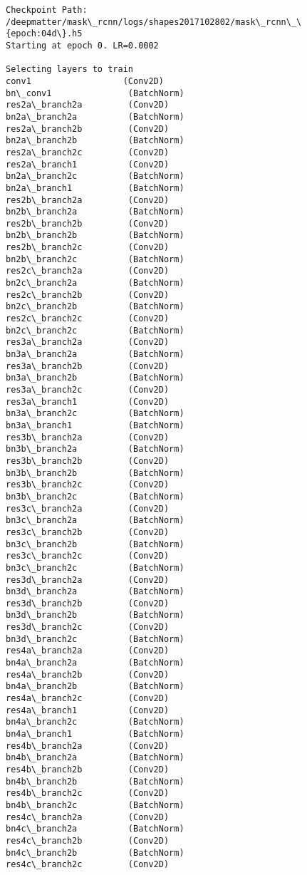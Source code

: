 \documentclass[11pt]{article}
\begin{document}
    \begin{Verbatim}[commandchars=\\\{\}]
Checkpoint Path:  /deepmatter/mask\_rcnn/logs/shapes2017102802/mask\_rcnn\_\{epoch:04d\}.h5
Starting at epoch 0. LR=0.0002

Selecting layers to train
conv1                  (Conv2D)
bn\_conv1               (BatchNorm)
res2a\_branch2a         (Conv2D)
bn2a\_branch2a          (BatchNorm)
res2a\_branch2b         (Conv2D)
bn2a\_branch2b          (BatchNorm)
res2a\_branch2c         (Conv2D)
res2a\_branch1          (Conv2D)
bn2a\_branch2c          (BatchNorm)
bn2a\_branch1           (BatchNorm)
res2b\_branch2a         (Conv2D)
bn2b\_branch2a          (BatchNorm)
res2b\_branch2b         (Conv2D)
bn2b\_branch2b          (BatchNorm)
res2b\_branch2c         (Conv2D)
bn2b\_branch2c          (BatchNorm)
res2c\_branch2a         (Conv2D)
bn2c\_branch2a          (BatchNorm)
res2c\_branch2b         (Conv2D)
bn2c\_branch2b          (BatchNorm)
res2c\_branch2c         (Conv2D)
bn2c\_branch2c          (BatchNorm)
res3a\_branch2a         (Conv2D)
bn3a\_branch2a          (BatchNorm)
res3a\_branch2b         (Conv2D)
bn3a\_branch2b          (BatchNorm)
res3a\_branch2c         (Conv2D)
res3a\_branch1          (Conv2D)
bn3a\_branch2c          (BatchNorm)
bn3a\_branch1           (BatchNorm)
res3b\_branch2a         (Conv2D)
bn3b\_branch2a          (BatchNorm)
res3b\_branch2b         (Conv2D)
bn3b\_branch2b          (BatchNorm)
res3b\_branch2c         (Conv2D)
bn3b\_branch2c          (BatchNorm)
res3c\_branch2a         (Conv2D)
bn3c\_branch2a          (BatchNorm)
res3c\_branch2b         (Conv2D)
bn3c\_branch2b          (BatchNorm)
res3c\_branch2c         (Conv2D)
bn3c\_branch2c          (BatchNorm)
res3d\_branch2a         (Conv2D)
bn3d\_branch2a          (BatchNorm)
res3d\_branch2b         (Conv2D)
bn3d\_branch2b          (BatchNorm)
res3d\_branch2c         (Conv2D)
bn3d\_branch2c          (BatchNorm)
res4a\_branch2a         (Conv2D)
bn4a\_branch2a          (BatchNorm)
res4a\_branch2b         (Conv2D)
bn4a\_branch2b          (BatchNorm)
res4a\_branch2c         (Conv2D)
res4a\_branch1          (Conv2D)
bn4a\_branch2c          (BatchNorm)
bn4a\_branch1           (BatchNorm)
res4b\_branch2a         (Conv2D)
bn4b\_branch2a          (BatchNorm)
res4b\_branch2b         (Conv2D)
bn4b\_branch2b          (BatchNorm)
res4b\_branch2c         (Conv2D)
bn4b\_branch2c          (BatchNorm)
res4c\_branch2a         (Conv2D)
bn4c\_branch2a          (BatchNorm)
res4c\_branch2b         (Conv2D)
bn4c\_branch2b          (BatchNorm)
res4c\_branch2c         (Conv2D)

\end{Verbatim}
\end{document}
